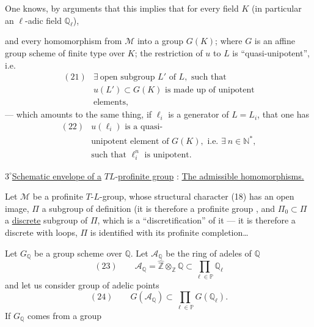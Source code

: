 One knows, by  arguments that this implies that for every  field $K$  (in particular an $\ell$-adic field $\mathbb{Q}_{\ell}$),


and every homomorphism from $\mathcal{M}$ into a group $G(K)$; where $G$ is an affine group scheme of finite type over $K$; 
the restriction of $u$ to $L$ is ``quasi-unipotent'', i.e.
\[
\begin{array}{ll}
(21)&\exists\ \text{open subgroup }L'\text{ of }L,\text{ such that}\\
&u(L')\subset G(K)\text{ is made up of unipotent}\\
&\text{elements},
\end{array}
\]
--- which amounts to the same thing, if $\ell_i$ is a generator of $L=L_i$, that one has
\[
\begin{array}{ll}
(22)&u(\ell_i)\text{ is a quasi-}\\
&\text{unipotent element of }G(K),\text{ i.e. }\exists\ n\in\mathbb{N}^{*},\\
&\text{such that }\ell_i^{n}\text{ is unipotent}.
\end{array}
\]


\textcircled{\(3^\circ\)}\quad \uline{Schematic envelope of a} \(T\)\unsure{-}\(L\)-\uline{profinite group} :  \uline{The admissible homomorphisms.}

Let \(\mathcal{M}\) be a profinite \(T\)-\(L\)-group, whose structural character (18)
has an open image, \(\Pi\) a  subgroup of definition (it is therefore a profinite group \unsure{)|]}, and \(\Pi_0\subset\Pi\) a \uline{discrete} subgroup of \(\Pi\), which is a ``discretification'' of it --- it is therefore a discrete  with loops,  \(\Pi\) is identified with its profinite completion\ldots

Let \(G_{\mathbb{Q}}\) be a group scheme  over \(\mathbb{Q}\). Let \(\mathcal{A}_{\mathbb{Q}}\) be the ring of adeles of \(\mathbb{Q}\)
\[
(23)\qquad \mathcal{A}_{\mathbb{Q}}=\widehat{\mathbb{Z}}\otimes_{\mathbb{Z}}\mathbb{Q}\subset\prod_{\ell\in\mathbb{P}}\mathbb{Q}_{\ell}
\]
and let us consider  group of adelic points
\[
(24)\qquad G(\mathcal{A}_{\mathbb{Q}})\subset\prod_{\ell\in\mathbb{P}}G(\mathbb{Q}_{\ell}).
\]
If \(G_{\mathbb{Q}}\) comes from a group 


